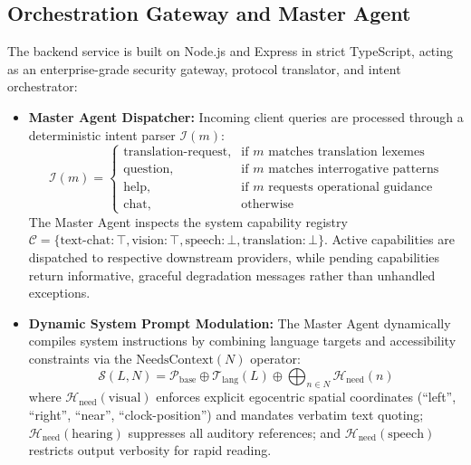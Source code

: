 \documentclass[10pt,a4paper]{article}
\begin{document}
\subsection{Orchestration Gateway and Master Agent}
The backend service is built on Node.js and Express in strict TypeScript, acting as an enterprise-grade security gateway, protocol translator, and intent orchestrator:
\begin{itemize}
    \item \textbf{Master Agent Dispatcher:} Incoming client queries are processed through a deterministic intent parser $\mathcal{I}(m)$:
    \begin{equation}
        \mathcal{I}(m) = \begin{cases}
            \text{translation-request}, & \text{if } m \text{ matches translation lexemes} \\
            \text{question}, & \text{if } m \text{ matches interrogative patterns} \\
            \text{help}, & \text{if } m \text{ requests operational guidance} \\
            \text{chat}, & \text{otherwise}
        \end{cases}
    \end{equation}
    The Master Agent inspects the system capability registry $\mathcal{C} = \{\text{text-chat}: \top, \text{vision}: \top, \text{speech}: \bot, \text{translation}: \bot\}$. Active capabilities are dispatched to respective downstream providers, while pending capabilities return informative, graceful degradation messages rather than unhandled exceptions.
    \item \textbf{Dynamic System Prompt Modulation:} The Master Agent dynamically compiles system instructions by combining language targets and accessibility constraints via the $\text{NeedsContext}(N)$ operator:
    \begin{equation}
        \mathcal{S}(L, N) = \mathcal{P}_{\text{base}} \oplus \mathcal{T}_{\text{lang}}(L) \oplus \bigoplus_{n \in N} \mathcal{H}_{\text{need}}(n)
    \end{equation}
    where $\mathcal{H}_{\text{need}}(\text{visual})$ enforces explicit egocentric spatial coordinates (``left'', ``right'', ``near'', ``clock-position'') and mandates verbatim text quoting; $\mathcal{H}_{\text{need}}(\text{hearing})$ suppresses all auditory references; and $\mathcal{H}_{\text{need}}(\text{speech})$ restricts output verbosity for rapid reading.
\end{itemize}
\end{document}

